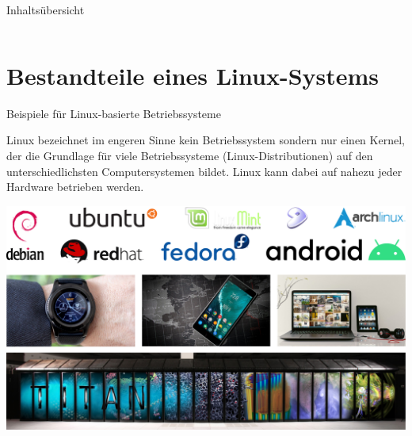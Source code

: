 \begin{frame}{Inhaltsübersicht}
\begin{columns}
    \end{columns}
\end{frame}

\section{Bestandteile eines Linux-Systems}

\begin{frame}{Beispiele für Linux-basierte Betriebssysteme}
    \parbox{\linewidth}{
        \footnotesize
        Linux bezeichnet im engeren Sinne kein Betriebssystem sondern nur einen
        Kernel, der die Grundlage für viele Betriebssysteme (Linux-Distributionen)
        auf den unterschiedlichsten Computersystemen bildet. Linux kann dabei auf
        nahezu jeder Hardware betrieben werden.
        \medskip
    }

    \includegraphics[width=\textwidth]{8-linux/img/linux-beispiele}
\end{frame}

